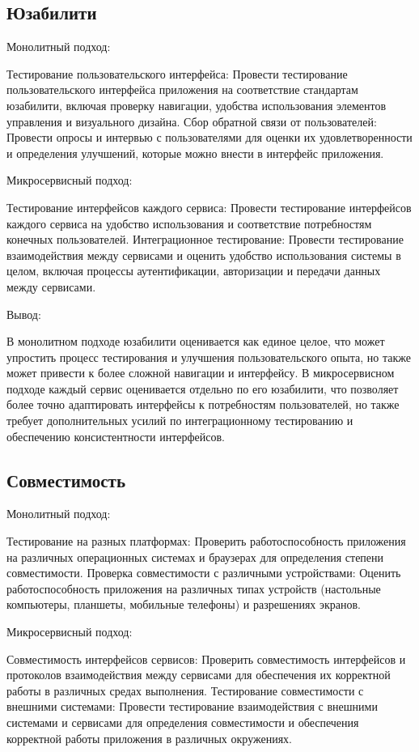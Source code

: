 \subsection{Юзабилити}

Монолитный подход:

    Тестирование пользовательского интерфейса: Провести тестирование пользовательского интерфейса приложения на соответствие стандартам юзабилити, включая проверку навигации, удобства использования элементов управления и визуального дизайна.
    Сбор обратной связи от пользователей: Провести опросы и интервью с пользователями для оценки их удовлетворенности и определения улучшений, которые можно внести в интерфейс приложения.

Микросервисный подход:

    Тестирование интерфейсов каждого сервиса: Провести тестирование интерфейсов каждого сервиса на удобство использования и соответствие потребностям конечных пользователей.
    Интеграционное тестирование: Провести тестирование взаимодействия между сервисами и оценить удобство использования системы в целом, включая процессы аутентификации, авторизации и передачи данных между сервисами.

Вывод:

    В монолитном подходе юзабилити оценивается как единое целое, что может упростить процесс тестирования и улучшения пользовательского опыта, но также может привести к более сложной навигации и интерфейсу.
    В микросервисном подходе каждый сервис оценивается отдельно по его юзабилити, что позволяет более точно адаптировать интерфейсы к потребностям пользователей, но также требует дополнительных усилий по интеграционному тестированию и обеспечению консистентности интерфейсов.

\subsection{Совместимость}

Монолитный подход:

    Тестирование на разных платформах: Проверить работоспособность приложения на различных операционных системах и браузерах для определения степени совместимости.
    Проверка совместимости с различными устройствами: Оценить работоспособность приложения на различных типах устройств (настольные компьютеры, планшеты, мобильные телефоны) и разрешениях экранов.

Микросервисный подход:

    Совместимость интерфейсов сервисов: Проверить совместимость интерфейсов и протоколов взаимодействия между сервисами для обеспечения их корректной работы в различных средах выполнения.
    Тестирование совместимости с внешними системами: Провести тестирование взаимодействия с внешними системами и сервисами для определения совместимости и обеспечения корректной работы приложения в различных окружениях.


